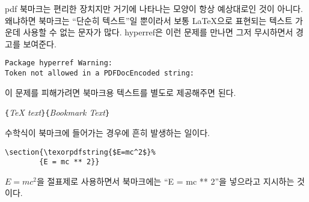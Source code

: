 pdf 북마크는 편리한 장치지만 거기에 나타나는 모양이 항상 예상대로인 것이 아니다. 왜냐하면 북마크는 ``단순히 텍스트''일 뿐이라서 보통 \LaTeX 으로 표현되는 텍스트 가운데 사용할 수 없는 문자가 많다. hyperref은 이런 문제를 만나면 그저 무시하면서 경고를 보여준다.
\begin{code}
\begin{verbatim}
Package hyperref Warning:
Token not allowed in a PDFDocEncoded string:
\end{verbatim}
\end{code}
이 문제를 피해가려면 북마크용 텍스트를 별도로 제공해주면 된다. 
\begin{lscommand}
\verb|{|\emph{\TeX{} text}\verb|}{|\emph{Bookmark Text}\verb|}|
\end{lscommand}

수학식이 북마크에 들어가는 경우에 흔히 발생하는 일이다.
\begin{code}
\begin{verbatim}
\section{\texorpdfstring{$E=mc^2$}%
        {E = mc ** 2}}
\end{verbatim}
\end{code}
$E=mc^2$을 절표제로 사용하면서 북마크에는 ``E = mc ** 2''을 넣으라고 지시하는 것이다.

